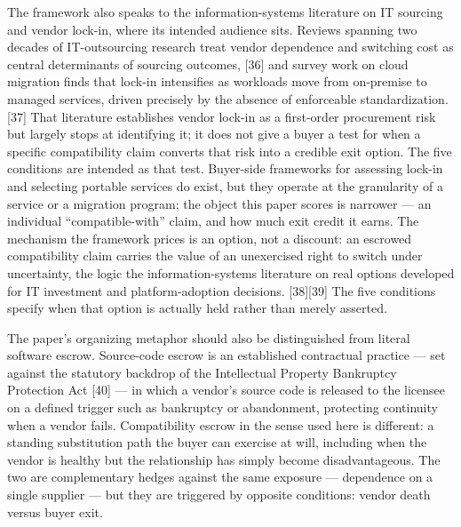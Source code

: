 \documentclass[11pt]{article}
\begin{document}
The framework also speaks to the information-systems literature on IT sourcing and vendor lock-in, where its intended audience sits. Reviews spanning two decades of IT-outsourcing research treat vendor dependence and switching cost as central determinants of sourcing outcomes, {[}36{]} and survey work on cloud migration finds that lock-in intensifies as workloads move from on-premise to managed services, driven precisely by the absence of enforceable standardization. {[}37{]} That literature establishes vendor lock-in as a first-order procurement risk but largely stops at identifying it; it does not give a buyer a test for when a specific compatibility claim converts that risk into a credible exit option. The five conditions are intended as that test. Buyer-side frameworks for assessing lock-in and selecting portable services do exist, but they operate at the granularity of a service or a migration program; the object this paper scores is narrower --- an individual ``compatible-with'' claim, and how much exit credit it earns. The mechanism the framework prices is an option, not a discount: an escrowed compatibility claim carries the value of an unexercised right to switch under uncertainty, the logic the information-systems literature on real options developed for IT investment and platform-adoption decisions. {[}38{]}{[}39{]} The five conditions specify when that option is actually held rather than merely asserted.

The paper's organizing metaphor should also be distinguished from literal software escrow. Source-code escrow is an established contractual practice --- set against the statutory backdrop of the Intellectual Property Bankruptcy Protection Act {[}40{]} --- in which a vendor's source code is released to the licensee on a defined trigger such as bankruptcy or abandonment, protecting continuity when a vendor fails. Compatibility escrow in the sense used here is different: a standing substitution path the buyer can exercise at will, including when the vendor is healthy but the relationship has simply become disadvantageous. The two are complementary hedges against the same exposure --- dependence on a single supplier --- but they are triggered by opposite conditions: vendor death versus buyer exit.
\end{document}
